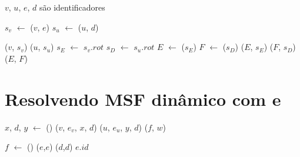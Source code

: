 $v$, $u$, $e$, $d$ são identificadores
\begin{algorithm}[htb]
\caption{\LCOSplice($v$, $e$, $u$, $d$)}
\label{Algo:LCOSplice}
\begin{algorithmic}[1]
\State $s_v$ $\gets$ \LCOFindSubNode($v$, $e$)
\State $s_u$ $\gets$ \LCOFindSubNode($u$, $d$)

\State \LCOCycle($v$, $s_v$)
\State \LCOSplit($u$, $s_u$)
\State $s_E$ $\gets$ $s_v$.$rot$
\State $s_D$ $\gets$ $s_u$.$rot$
\State $E$ $\gets$ \LCOFindNode($s_E$)
\State $F$ $\gets$ \LCOFindNode($s_D$)
\State \LCOCycle($E$, $s_E$)
\State \LCOCycle($F$, $s_D$)
\State \LCOMerge($E$, $F$)

\EndIf
\end{algorithmic}
\end{algorithm}

\section{Resolvendo MSF dinâmico com \LCOSplice{} e \LCOMakeEdge{}}

\begin{algorithm}[htb]
\caption{\MSFaddEdge($v$, $e_v$, $u$, $e_u$)}
\label{Algo:MSFaddEdge}
\begin{algorithmic}[1]
\State $x$, $d$, $y$ $\gets$ \LCOMakeEdge()
\State \LCOSplice($v$, $e_v$, $x$, $d$)
\State \LCOSplice($u$, $e_u$, $y$, $d$)
\State \MSFupdate($f$, $w$)
\end{algorithmic}
\end{algorithm}


\begin{algorithm}[htb]
\caption{\MSFdelEdge($e$, $d$)}
\label{Algo:MSFdelEdge}
\begin{algorithmic}[1]
\State $f$ $\gets$ \LCOMakeEdge()
\State \LCOSplice($e$,$e$)
\State \LCOSplice($d$,$d$)
\State \Return $e$.$id$ 
\end{algorithmic}
\end{algorithm}
